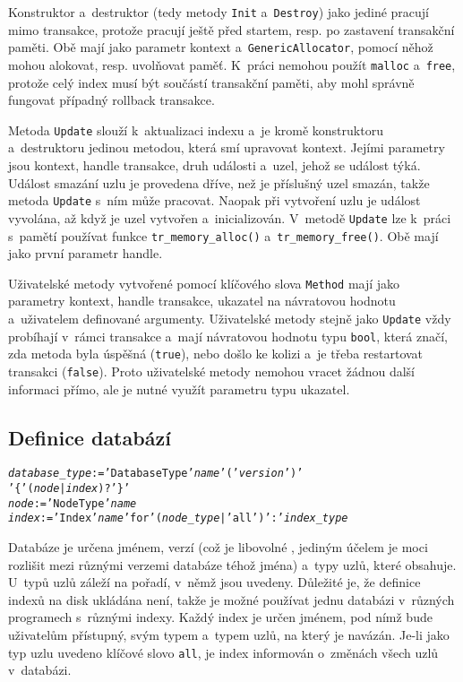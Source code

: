 Konstruktor a~destruktor (tedy metody \verb|Init| a~\verb|Destroy|) jako jediné
pracují mimo transakce, protože pracují ještě před startem, resp. po zastavení
transakční paměti. Obě mají jako parametr kontext a~\verb|GenericAllocator|, pomocí
něhož mohou alokovat, resp. uvolňovat paměť. K~práci nemohou použít \verb|malloc|
a~\verb|free|, protože celý index musí být součástí transakční paměti, aby
mohl správně fungovat případný rollback transakce.

Metoda \verb|Update| slouží k~aktualizaci indexu a~je kromě konstruktoru a~destruktoru
jedinou metodou, která smí upravovat kontext. Jejími parametry jsou kontext, handle
transakce, druh události a~uzel, jehož se událost týká. Událost smazání uzlu je
provedena dříve, než je příslušný uzel smazán, takže metoda \verb|Update| s~ním
může pracovat. Naopak při vytvoření uzlu je událost vyvolána, až když je uzel vytvořen
a~inicializován. V~metodě \verb|Update| lze k~práci s~pamětí používat funkce
\verb|tr_memory_alloc()| a~\verb|tr_memory_free()|. Obě mají jako první parametr
handle.

Uživatelské metody vytvořené pomocí klíčového slova \verb|Method| mají jako parametry
kontext, handle transakce, ukazatel na návratovou hodnotu a~uživatelem definované
argumenty. Uživatelské metody stejně jako \verb|Update| vždy probíhají v~rámci transakce
a~mají návratovou hodnotu typu \verb|bool|, která značí, zda metoda byla úspěšná
(\verb|true|), nebo došlo ke kolizi a~je třeba restartovat transakci (\verb|false|).
Proto uživatelské metody nemohou vracet žádnou další informaci přímo, ale je nutné
využít parametru typu ukazatel.

\subsection{Definice databází}
\begin{alltt}
{\sl{}database\_type} := 'DatabaseType' {\sl{}name} '(' {\sl{}version} ')' 
                 '\{' ( {\sl{}node} | {\sl{}index} )? '\}'
{\sl{}node} := 'NodeType' {\sl{}name}
{\sl{}index} := 'Index' {\sl{}name} 'for' ( {\sl{}node\_type} | 'all' ) ':' {\sl{}index\_type}
\end{alltt}

Databáze je určena jménem, verzí (což je libovolné , jediným účelem je
moci rozlišit mezi různými verzemi databáze téhož jména) a~typy uzlů, které obsahuje.
U~typů uzlů záleží na pořadí, v~němž jsou uvedeny. Důležité je, že definice indexů
na disk ukládána není, takže je možné používat jednu databázi v~různých programech
s~různými indexy. Každý index je určen jménem, pod nímž bude uživatelům přístupný,
svým typem a~typem uzlů, na který je navázán. Je-li jako typ uzlu uvedeno klíčové
slovo \verb|all|, je index informován o~změnách všech uzlů v~databázi.

